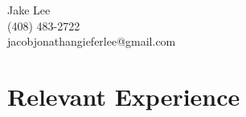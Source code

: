 \documentclass[12pt]{article}
\begin{document}
\begin{Large}
\noindent  Jake Lee\\(408) 483-2722\\
  jacobjonathangieferlee@gmail.com
\end{Large}
\section*{Relevant Experience}
\end{document}
